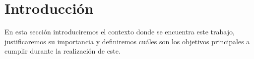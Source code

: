 \chapter{Introducción} \label{section:Introducción}
En esta sección introduciremos el contexto donde se encuentra este trabajo, justificaremos su importancia y definiremos cuáles son los objetivos principales a cumplir durante la realización de este.




